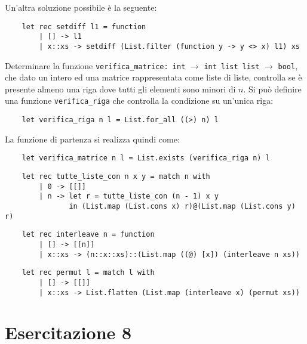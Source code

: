 \documentclass{article}
\numberwithin{equation}{subsection}
\begin{document}
Un'altra soluzione possibile è la seguente:
\begin{verbatim}
    let rec setdiff l1 = function
        | [] -> l1
        | x::xs -> setdiff (List.filter (function y -> y <> x) l1) xs    
\end{verbatim}


Determinare la funzione \verb|verifica_matrice: int| $\rightarrow$ \verb|int list list| $\rightarrow$ \verb|bool|, che dato un intero ed una matrice rappresentata come liste di liste, controlla se è presente almeno una riga dove tutti gli elementi sono minori di $n$. Si può definire una funzione \verb|verifica_riga| che controlla la condizione su un'unica riga:
\begin{verbatim}
    let verifica_riga n l = List.for_all ((>) n) l 
\end{verbatim}
La funzione di partenza si realizza quindi come:
\begin{verbatim}
    let verifica_matrice n l = List.exists (verifica_riga n) l    
\end{verbatim}

\begin{verbatim}
    let rec tutte_liste_con n x y = match n with
        | 0 -> [[]]
        | n -> let r = tutte_liste_con (n - 1) x y
               in (List.map (List.cons x) r)@(List.map (List.cons y) r)
\end{verbatim}

\begin{verbatim}
    let rec interleave n = function
        | [] -> [[n]]
        | x::xs -> (n::x::xs)::(List.map ((@) [x]) (interleave n xs))
\end{verbatim}

\begin{verbatim}
    let rec permut l = match l with
        | [] -> [[]]
        | x::xs -> List.flatten (List.map (interleave x) (permut xs))
\end{verbatim}

\clearpage

\section{Esercitazione 8}





\end{document}
